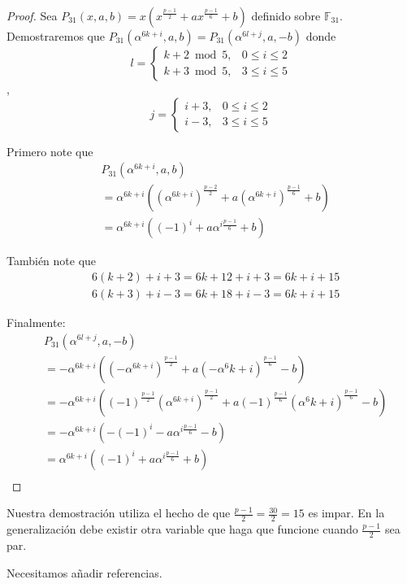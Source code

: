 \documentclass[12pt]{article}
\begin{document}
\begin{proof}
	Sea $P_{31}(x,a,b) = x(x^{\frac{p-1}{2}}+ax^{\frac{p-1}{6}}+b)$ definido sobre $\mathbb{F}_{31}$. Demostraremos que $P_{31}(\alpha^{6k+i},a,b) = P_{31}(\alpha^{6l+j},a,-b)$ donde
	$$
	l =
	\begin{cases}
	k+2 \bmod{5}, & 0 \leq i \leq 2 \\
	k+3 \bmod{5}, & 3 \leq i \leq 5
	\end{cases}
	$$
	,
	$$
	j =
	\begin{cases}
	i+3, & 0 \leq i \leq 2 \\
	i-3, & 3 \leq i \leq 5
	\end{cases}
	$$
	
	Primero note que 
	\begin{align*}
	&P_{31}(\alpha^{6k+i},a,b) \\
	&=\alpha^{6k+i}((\alpha^{6k+i})^{\frac{p-2}{2}}+a(\alpha^{6k+i})^{\frac{p-1}{6}}+b) \\
	&=\alpha^{6k+i}((-1)^{i}+a\alpha^{i\frac{p-1}{6}}+b)
	\end{align*}

	Tambi\'en note que
	\begin{align*}
	&6(k+2)+i+3=6k+12+i+3=6k+i+15 \\
	&6(k+3)+i-3=6k+18+i-3=6k+i+15
	\end{align*}

	Finalmente:
	\begin{align*}
	&P_{31}(\alpha^{6l+j},a,-b)	\\
	&= -\alpha^{6k+i}((-\alpha^{6k+i})^\frac{p-1}{2}+a(-\alpha^6k+i)^\frac{p-1}{6}-b) \\
	&= -\alpha^{6k+i}((-1)^{\frac{p-1}{2}}(\alpha^{6k+i})^\frac{p-1}{2}+a(-1)^{\frac{p-1}{6}}(\alpha^6k+i)^\frac{p-1}{6}-b) \\
	&= -\alpha^{6k+i}(-(-1)^{i}-a\alpha^{i\frac{p-1}{6}}-b) \\
	&= \alpha^{6k+i}((-1)^{i}+a\alpha^{i\frac{p-1}{6}}+b) \\
	\end{align*}
	
\end{proof}

Nuestra demostraci\'on utiliza el hecho de que $\frac{p-1}{2} = \frac{30}{2}=15$ es impar. En la generalizaci\'on debe existir otra variable que haga que funcione cuando $\frac{p-1}{2}$ sea par. 


\begin{thebibliography}{}

Necesitamos a\~nadir referencias.

\end{thebibliography}
\end{document}
